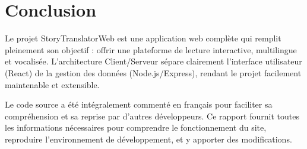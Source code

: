 \documentclass[12pt,twoside,letterpaper]{article}
\begin{document}
\newpage
\section{Conclusion}
Le projet StoryTranslatorWeb est une application web complète qui remplit pleinement son objectif : offrir une plateforme de lecture interactive, multilingue et vocalisée. L'architecture Client/Serveur sépare clairement l'interface utilisateur (React) de la gestion des données (Node.js/Express), rendant le projet facilement maintenable et extensible.

Le code source a été intégralement commenté en français pour faciliter sa compréhension et sa reprise par d'autres développeurs. Ce rapport fournit toutes les informations nécessaires pour comprendre le fonctionnement du site, reproduire l'environnement de développement, et y apporter des modifications.

% 
\end{document}
